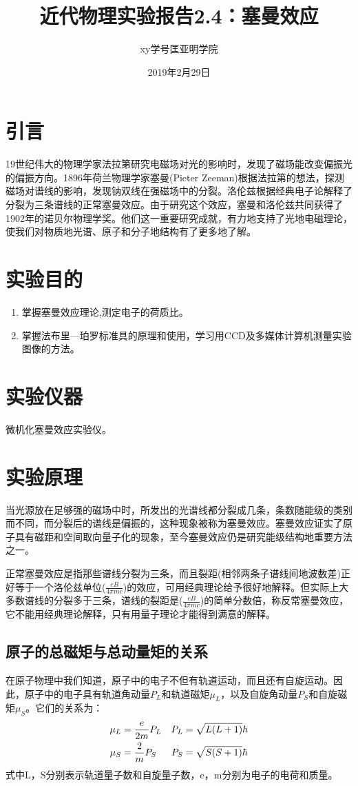 \documentclass[a4paper]{article}
\title{近代物理实验报告2.4：塞曼效应}
\author{xy\quad 学号\quad 匡亚明学院}
\date{2019年2月29日}
\begin{document}
\maketitle


\section{引言}
19世纪伟大的物理学家法拉第研究电磁场对光的影响时，发现了磁场能改变偏振光的偏振方向。1896年荷兰物理学家塞曼(Pieter Zeeman)根据法拉第的想法，探测磁场对谱线的影响，发现钠双线在强磁场中的分裂。洛伦兹根据经典电子论解释了分裂为三条谱线的正常塞曼效应。由于研究这个效应，塞曼和洛伦兹共同获得了1902年的诺贝尔物理学奖。他们这一重要研究成就，有力地支持了光地电磁理论，使我们对物质地光谱、原子和分子地结构有了更多地了解。

\section{实验目的}
\begin{enumerate}
\item 掌握塞曼效应理论,测定电子的荷质比。
\item 掌握法布里—珀罗标准具的原理和使用，学习用CCD及多媒体计算机测量实验图像的方法。
\end{enumerate}

\section{实验仪器}
微机化塞曼效应实验仪。

\section{实验原理}
当光源放在足够强的磁场中时，所发出的光谱线都分裂成几条，条数随能级的类别而不同，而分裂后的谱线是偏振的，这种现象被称为塞曼效应。塞曼效应证实了原子具有磁距和空间取向量子化的现象，至今塞曼效应仍是研究能级结构地重要方法之一。

正常塞曼效应是指那些谱线分裂为三条，而且裂距(相邻两条子谱线间地波数差)正好等于一个洛伦兹单位($\frac{eB}{4\pi mc}$)的效应，可用经典理论给予很好地解释。但实际上大多数谱线的分裂多于三条，谱线的裂距是($\frac{eB}{4\pi mc}$)的简单分数倍，称反常塞曼效应，它不能用经典理论解释，只有用量子理论才能得到满意的解释。
\subsection{原子的总磁矩与总动量矩的关系}
在原子物理中我们知道，原子中的电子不但有轨道运动，而且还有自旋运动。因此，原子中的电子具有轨道角动量$P_L$和轨道磁矩$\mu_L$，以及自旋角动量$P_S$和自旋磁矩$\mu_S$。它们的关系为：
\begin{align}
\mu_L &= \frac{e}{2m}P_L & P_L &= \sqrt{L(L+1)}\hbar \notag \\
\mu_S &= \frac{2}{m}P_S & P_S &= \sqrt{S(S+1)}\hbar\label{eq1}
\end{align}
式中L，S分别表示轨道量子数和自旋量子数，e，m分别为电子的电荷和质量。
\end{document}

